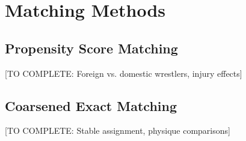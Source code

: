 \section{Matching Methods}

\subsection{Propensity Score Matching}

[TO COMPLETE: Foreign vs. domestic wrestlers, injury effects]

\subsection{Coarsened Exact Matching}

[TO COMPLETE: Stable assignment, physique comparisons]